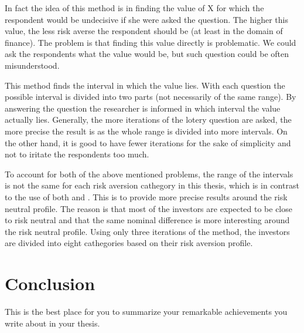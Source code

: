 In fact the idea of this method is in finding the value of X for which the respondent would be undecisive if she were asked the question. The higher this value, the less risk averse the respondent should be (at least in the domain of finance). The problem is that finding this value directly is problematic. We could ask the respondents what the value would be, but such question could be often misunderstood.

This method finds the interval in which the value lies. With each question the possible interval is divided into two parts (not necessarily of the same range). By answering the question the researcher is informed in which interval the value actually lies. Generally, the more iterations of the lotery question are asked, the more precise the result is as the whole range is divided into more intervals. On the other hand, it is good to have fewer iterations for the sake of simplicity and not to iritate the respondents too much. 

To account for both of the above mentioned problems, the range of the intervals is not the same for each risk aversion cathegory in this thesis, which is in contrast to the use of both \cite{Hudcova2017} and \cite{Falk2016}. This is to provide more precise results around the risk neutral profile. The reason is that most of the investors are expected to be close to risk neutral and that the same nominal difference is more interesting around the risk neutral profile. Using only three iterations of the method, the investors are divided into eight cathegories based on their risk aversion profile.








\newpage
\section*{Conclusion}

This is the best place for you to summarize your remarkable
achievements you write about in your thesis.
